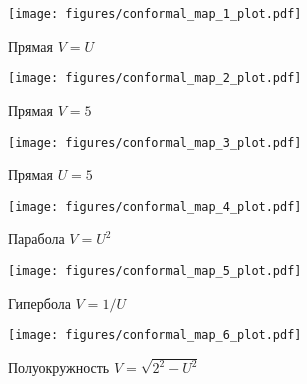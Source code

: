 \begin{frame}
	\begin{figure}
		\centering
		\texttt{[image: figures/conformal\_map\_1\_plot.pdf]}
		\caption{Прямая \(V=U\)}\label{fig:conformal_1}
	\end{figure}
\end{frame}

\begin{frame}
	\begin{figure}
		\centering
		\texttt{[image: figures/conformal\_map\_2\_plot.pdf]}
		\caption{Прямая \(V = 5\)}\label{fig:conformal_2}
	\end{figure}
\end{frame}

\begin{frame}
	\begin{figure}
		\centering
		\texttt{[image: figures/conformal\_map\_3\_plot.pdf]}
		\caption{Прямая \(U = 5\)}\label{fig:conformal_3}
	\end{figure}
\end{frame}



\begin{frame}
	\begin{figure}
		\centering
		\texttt{[image: figures/conformal\_map\_4\_plot.pdf]}
		\caption{Парабола \(V=U^2\)}\label{fig:conformal_4}
	\end{figure}
\end{frame}

\begin{frame}
	\begin{figure}
		\centering
		\texttt{[image: figures/conformal\_map\_5\_plot.pdf]}
		\caption{Гипербола \(V = 1/U\)}\label{fig:conformal_5}
	\end{figure}
\end{frame}


\begin{frame}
	\begin{figure}
		\centering
		\texttt{[image: figures/conformal\_map\_6\_plot.pdf]}
		\caption{Полуокружность \(V = \sqrt{2^2-U^2}\)}\label{fig:conformal_6}
	\end{figure}
\end{frame}
